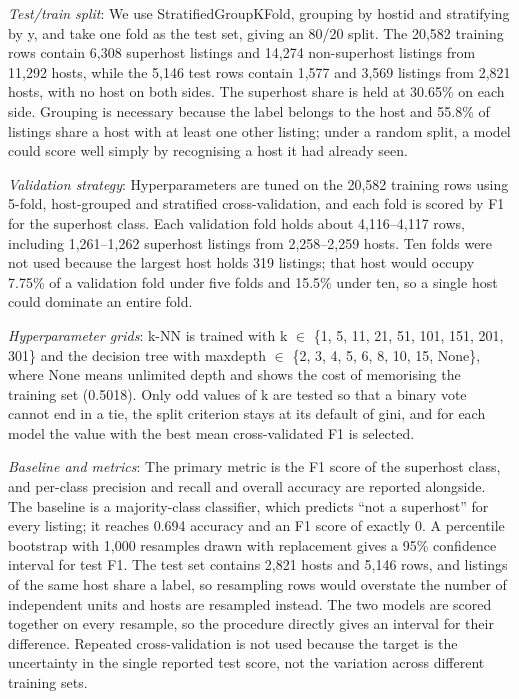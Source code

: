 \documentclass[final,1p,11pt]{elsarticle}
\renewcommand\_{\textunderscore\allowbreak}%
\begin{document}
\textit{Test/train split}: We use StratifiedGroupKFold, grouping by host\_id and stratifying by y, and take one fold as the test set, giving an 80/20 split. The 20,582 training rows contain 6,308 superhost listings and 14,274 non-superhost listings from 11,292 hosts, while the 5,146 test rows contain 1,577 and 3,569 listings from 2,821 hosts, with no host on both sides. The superhost share is held at 30.65\% on each side. Grouping is necessary because the label belongs to the host and 55.8\% of listings share a host with at least one other listing; under a random split, a model could score well simply by recognising a host it had already seen.

\textit{Validation strategy}: Hyperparameters are tuned on the 20,582 training rows using 5-fold, host-grouped and stratified cross-validation, and each fold is scored by F1 for the superhost class. Each validation fold holds about 4,116–4,117 rows, including 1,261–1,262 superhost listings from 2,258–2,259 hosts. Ten folds were not used because the largest host holds 319 listings; that host would occupy 7.75\% of a validation fold under five folds and 15.5\% under ten, so a single host could dominate an entire fold.

\textit{Hyperparameter grids}: k-NN is trained with k $\in$ \{1, 5, 11, 21, 51, 101, 151, 201, 301\} and the decision tree with max\_depth $\in$ \{2, 3, 4, 5, 6, 8, 10, 15, None\}, where None means unlimited depth and shows the cost of memorising the training set (0.5018). Only odd values of k are tested so that a binary vote cannot end in a tie, the split criterion stays at its default of gini, and for each model the value with the best mean cross-validated F1 is selected.

\textit{Baseline and metrics}: The primary metric is the F1 score of the superhost class, and per-class precision and recall and overall accuracy are reported alongside. The baseline is a majority-class classifier, which predicts “not a superhost” for every listing; it reaches 0.694 accuracy and an F1 score of exactly 0. A percentile bootstrap with 1,000 resamples drawn with replacement gives a 95\% confidence interval for test F1. The test set contains 2,821 hosts and 5,146 rows, and listings of the same host share a label, so resampling rows would overstate the number of independent units and hosts are resampled instead. The two models are scored together on every resample, so the procedure directly gives an interval for their difference. Repeated cross-validation is not used because the target is the uncertainty in the single reported test score, not the variation across different training sets.
\end{document}
